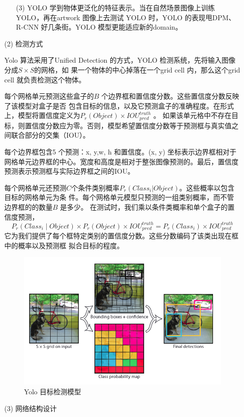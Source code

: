 \begin{enumerate}
\begin{enumerate}
		\item[(3)] YOLO 学到物体更泛化的特征表示。当在自然场景图像上训练YOLO，再在artwork 图像上去测试
		YOLO 时，YOLO 的表现甩DPM、R-CNN 好几条街。YOLO 模型更能适应新的domain。
	\end{enumerate}

	\item[(2)]检测方式
	
	Yolo 算法采用了Unified Detection 的方式，YOLO 检测系统，先将输入图像分成$S × S $的网格，如
	果一个物体的中心掉落在一个grid cell 内，那么这个grid cell 就负责检测这个物体。
	
	每个网格单元预测这些盒子的$B$ 个边界框和置信度分数。这些置信度分数反映了该模型对盒子是否
	包含目标的信息，以及它预测盒子的准确程度。在形式上，模型将置信度定义为$P_r(Object)×IOU^{truth}_{pred}$ 。
	如果该单元格中不存在目标，则置信度分数应为零。否则，模型希望置信度分数等于预测框与真实值之
	间联合部分的交集（IOU）。
	
	每个边界框包含5 个预测：x, y,w, h 和置信度。(x, y) 坐标表示边界框相对于网格单元边界框的中心。宽度和高度是相对于整张图像预测的。最后，置信度预测表示预测框与实际边界框之间的IOU。
	
	每个网格单元还预测$C$个条件类别概率$P_r(Class_i|Object)$。这些概率以包含目标的网格单元为条
	件。每个网格单元模型只预测的一组类别概率，而不管边界框的的数量$B$ 是多少。
	在测试时，我们乘以条件类概率和单个盒子的置信度预测，
	\begin{equation}
		P_{r}\left(Class_{i} \mid Object\right) \times P_{r}(Object) \times I O U_{pred}^{truth}=P_{r}\left(Class_{i}\right) \times I O U_{pred}^{truth}
	\end{equation}
	它为我们提供了每个框特定类别的置信度分数。这些分数编码了该类出现在框中的概率以及预测框
	拟合目标的程度。
	\begin{figure}
		\centering
		\includegraphics[width=0.6\linewidth]{screenshot011}
		\caption{Yolo 目标检测模型}
		\label{fig:screenshot011}
	\end{figure}
	
	\item[(3)] 网络结构设计
	

\end{enumerate}
